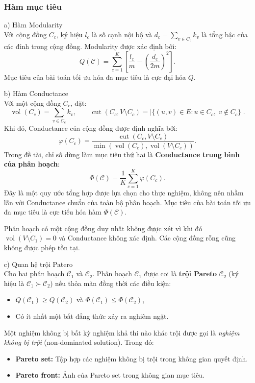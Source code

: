 \documentclass[14pt,a4paper]{extarticle}
\begin{document}
\subsubsection{Hàm mục tiêu}

\noindent a) Hàm Modularity
\noindent \\ 
Với cộng đồng $C_c$, ký hiệu $l_c$ là số cạnh nội bộ và $d_c=\sum_{v\in C_c}k_v$
 là tổng bậc của các đỉnh trong cộng đồng. Modularity được xác định bởi:
\[
Q(\mathcal{C})
=
\sum_{c=1}^{K}
\left[
\frac{l_c}{m}
-
\left(\frac{d_c}{2m}\right)^2
\right].
\]
Mục tiêu của bài toán tối ưu hóa đa mục tiêu là cực đại hóa $Q$.

\noindent b) Hàm Conductance
\noindent \\ 
Với một cộng đồng $C_c$, đặt: 
\[
\operatorname{vol}(C_c)=\sum_{v\in C_c}k_v,
\qquad
\operatorname{cut}(C_c,V\setminus C_c)
=
|\{(u,v)\in E:u\in C_c,\;v\notin C_c\}|.
\]
Khi đó, Conductance của cộng đồng được định nghĩa bởi:
\[
\varphi(C_c)
=
\frac{
\operatorname{cut}(C_c,V\setminus C_c)
}{
\min\left(
\operatorname{vol}(C_c),
\operatorname{vol}(V\setminus C_c)
\right)
}.
\]
Trong đề tài, chỉ số dùng làm mục tiêu thứ hai là \textbf{Conductance trung bình của phân hoạch}:
\[
\Phi(\mathcal{C})
=
\frac{1}{K}\sum_{c=1}^{K}\varphi(C_c).
\]
Đây là một quy ước tổng hợp được lựa chọn cho thực nghiệm, không nên nhầm lẫn với Conductance chuẩn của toàn bộ phân hoạch. Mục tiêu của bài toán tối ưu đa mục tiêu là cực tiểu hóa hàm $\Phi(\mathcal{C})$.

Phân hoạch có một cộng đồng duy nhất không được xét vì khi đó $\operatorname{vol}(V\setminus C_1)=0$ và Conductance không xác định. Các cộng đồng rỗng cũng không được phép tồn tại.


\noindent c) Quan hệ trội Patero
\\ 
Cho hai phân hoạch $\mathcal{C}_1$ và $\mathcal{C}_2$. Phân hoạch $\mathcal{C}_1$ được coi là \textbf{trội Pareto} $\mathcal{C}_2$ (ký hiệu là $\mathcal{C}_1 \succ \mathcal{C}_2$) nếu thỏa mãn đồng thời các điều kiện:
\begin{itemize}
    \item $Q(\mathcal{C}_1) \ge Q(\mathcal{C}_2)$ và $\Phi(\mathcal{C}_1) \le \Phi(\mathcal{C}_2)$,
    \item Có ít nhất một bất đẳng thức xảy ra nghiêm ngặt.
\end{itemize}

Một nghiệm không bị bất kỳ nghiệm khả thi nào khác trội được gọi là \textit{nghiệm không bị trội} (non-dominated solution). Trong đó:
\begin{itemize}
    \item \textbf{Pareto set:} Tập hợp các nghiệm không bị trội trong không gian quyết định.
    \item \textbf{Pareto front:} Ảnh của Pareto set trong không gian mục tiêu.
\end{itemize}
\end{document}
